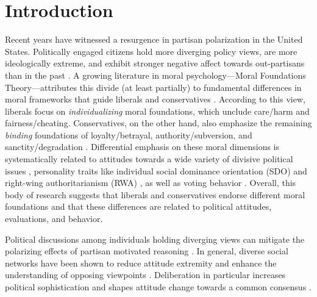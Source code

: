 \documentclass[11pt,]{article}
\begin{document}
\noindent \doublespacing \section{Introduction}\label{introduction}

Recent years have witnessed a resurgence in partisan polarization in the
United States. Politically engaged citizens hold more diverging policy
views, are more ideologically extreme, and exhibit stronger negative
affect towards out-partisans than in the past
\citep{hetherington2001resurgent, abramowitz2008polarization, iyengar2012affect, mason2014disrespectfully, huddy2015expressive, iyengar2015fear}.
A growing literature in moral psychology---Moral Foundations
Theory---attributes this divide (at least partially) to fundamental
differences in moral frameworks that guide liberals and conservatives
\citep{haidt2012righteous}. According to this view, liberals focus on
\emph{individualizing} moral foundations, which unclude care/harm and
fairness/cheating. Conservatives, on the other hand, also emphasize the
remaining \emph{binding} foundations of loyalty/betrayal,
authority/subversion, and sanctity/degradation
\citep{haidt2007morality, graham2009liberals, haidt2012righteous}.
Differential emphasis on these moral dimensions is systematically
related to attitudes towards a wide variety of divisive political issues
\citep[e.g.][]{koleva2012tracing, kertzer2014moral, low2015moral},
personality traits like individual social dominance orientation (SDO)
and right-wing authoritarianism (RWA) \citep{federico2013mapping}, as
well as voting behavior \citep{franks2015using}. Overall, this body of
research suggests that liberals and conservatives endorse different
moral foundations and that these differences are related to political
attitudes, evaluations, and behavior.

Political discussions among individuals holding diverging views can
mitigate the polarizing effects of partisan motivated reasoning
\citep[see also][]{mendelberg2002deliberative, eveland2011beyond}. In
general, diverse social networks have been shown to reduce attitude
extremity \citep{levitan2009social} and enhance the understanding of
opposing viewpoints \citep{mutz2002cross}. Deliberation in particular
increases political sophistication \citep{gastil1999increasing} and
shapes attitude change towards a common consensus
\citep{vinokur1978depolarization, barabas2004deliberation}.
\end{document}
